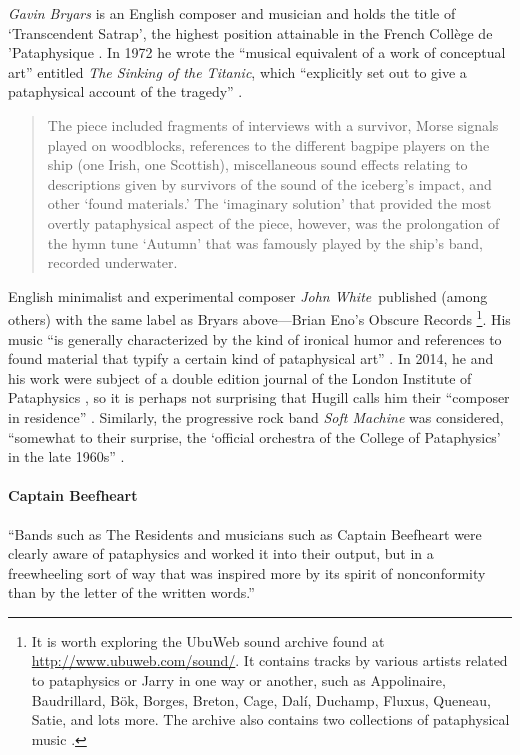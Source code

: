\emph{Gavin Bryars} is an English composer and musician and holds the title of `Transcendent Satrap', the highest position attainable in the French Collège de {'}Pataphysique \autocite{Bryars2010}. In 1972 he wrote the ``musical equivalent of a work of conceptual art'' \autocite*{Bryars2009} entitled \textit{The Sinking of the Titanic}, which ``explicitly set out to give a pataphysical account of the tragedy'' \autocite{Hugill2012}.

\begin{quotation}
  The piece included fragments of interviews with a survivor, Morse signals played on woodblocks, references to the different bagpipe players on the ship (one Irish, one Scottish), miscellaneous sound effects relating to descriptions given by survivors of the sound of the iceberg’s impact, and other `found materials.' The `imaginary solution' that provided the most overtly pataphysical aspect of the piece, however, was the prolongation of the hymn tune `Autumn' that was famously played by the ship’s band, recorded underwater. 
\end{quotation}

English minimalist and experimental composer \emph{John White}\ published (among others) with the same label as Bryars above---Brian Eno's Obscure Records \autocite{UbuWeb}\footnote{It is worth exploring the UbuWeb sound archive found at \url{http://www.ubuweb.com/sound/}. It contains tracks by various artists related to pataphysics or Jarry in one way or another, such as Appolinaire, Baudrillard, Bök, Borges, Breton, Cage, Dalí, Duchamp, Fluxus, Queneau, Satie, and lots more. The archive also contains two collections of pataphysical music \autocite{UbuWebUseless, UbuWebPata}.}. His music ``is generally characterized by the kind of ironical humor and references to found material that typify a certain kind of pataphysical art'' \autocite{Hugill2012}. In 2014, he and his work were subject of a double edition journal of the London Institute of Pataphysics \autocite{Smith2014, White2014}, so it is perhaps not surprising that Hugill calls him their ``composer in residence'' \autocite{Hugill2012}. Similarly, the progressive rock band \emph{Soft Machine} was considered, ``somewhat to their surprise, the `official orchestra of the College of Pataphysics' in the late 1960s'' \autocite{Hugill2012}.




\spirals

\paragraph{Captain Beefheart}
``Bands such as The Residents and musicians such as Captain Beefheart were clearly aware of pataphysics and worked it into their output, but in a freewheeling sort of way that was inspired more by its spirit of nonconformity than by the letter of the written words.''\autocite*{Hugill2012}

